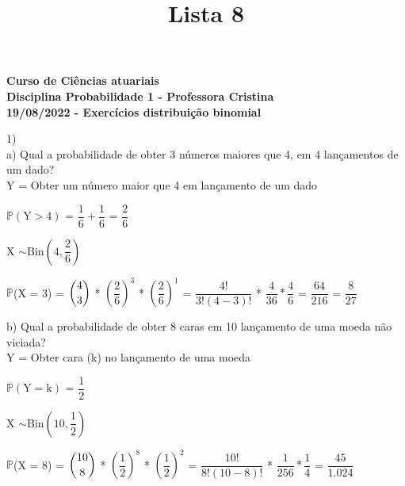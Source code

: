 \documentclass[12pt,a4paper,draft]{article}
\title{Lista 8}
\date{}
\begin{document}
		\maketitle
		\begin{center}
			\textbf{Curso de Ciências atuariais}\\
			\textbf{Disciplina Probabilidade 1 - Professora Cristina}\\
			\textbf{19/08/2022 - Exercícios distribuição binomial}
		\end{center}
	1)\\
	a) Qual a probabilidade de obter 3 números maiores que 4, em 4 lançamentos de
	um dado?
	\vspace{0.5cm}\\
	Y = Obter um número maior que 4 em lançamento de um dado		\vspace{1cm}\\
	\begin{center}
		$\mathbb{P}\left(\text{Y} > 4\right)$ = $\dfrac{1}{6} + \dfrac{1}{6}$ = $\dfrac{2}{6}$
		\vspace{1cm}\\
	\end{center}
	X $\sim \text{Bin}\left(4, \dfrac{2}{6}\right)$
	\vspace{1cm}\\
	\begin{center}
		$\mathbb{P}$(X = 3) = $\dbinom{4}{3}$ * $\left(\dfrac{2}{6}\right)^3$ * $\left(\dfrac{2}{6}\right)^1$ = $\dfrac{4!}{3!(4-3)!}$ * $\dfrac{4}{36} * \dfrac{4}{6}$ = $\dfrac{64}{216}$ = $\dfrac{8}{27}$
	\end{center}
	\vspace{1cm}
	b) Qual a probabilidade de obter 8 caras em 10 lançamento de uma moeda não viciada?
	\vspace{0.5cm}\\
	Y = Obter cara (k) no lançamento de uma moeda
	\vspace{1cm}\\
	\begin{center}
		$\mathbb{P}\left(\text{Y} = \text{k}\right)$ = $\dfrac{1}{2}$
		\vspace{1cm}\\
	\end{center}
	X $\sim \text{Bin}\left(10, \dfrac{1}{2}\right)$
	\vspace{1cm}\\
	\begin{center}
		$\mathbb{P}$(X = 8) = $\dbinom{10}{8}$ * $\left(\dfrac{1}{2}\right)^8$ * $\left(\dfrac{1}{2}\right)^2$ = $\dfrac{10!}{8!(10-8)!}$ * $\dfrac{1}{256} * \dfrac{1}{4}$ = $\dfrac{45}{1.024}$
	\end{center}
\end{document}

